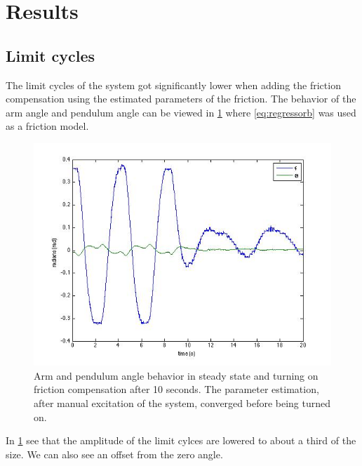 \documentclass[10pt,a4paper]{article}
\begin{document}
\section{Results}


\subsection{Limit cycles}
The limit cycles of the system got significantly lower when adding the friction compensation using the estimated parameters of the friction. The behavior of the arm angle and pendulum angle can be viewed in \ref{fig:onoffcompensation} where \ref{eq:regressorb} was used as a friction model.
\begin{figure}[H]
\begin{center}
\includegraphics[scale=0.6]{plots/onoffcompensation.jpg}
\caption{Arm and pendulum angle behavior in steady state and turning on friction compensation after 10 seconds. The parameter estimation, after manual excitation of the system, converged before being turned on.}
\label{fig:onoffcompensation}
\end{center}
\end{figure}
In \ref{fig:onoffcompensation} see that the amplitude of the limit cylces are lowered to about a third of the size. We can also see an offset from the zero angle.
\end{document}
